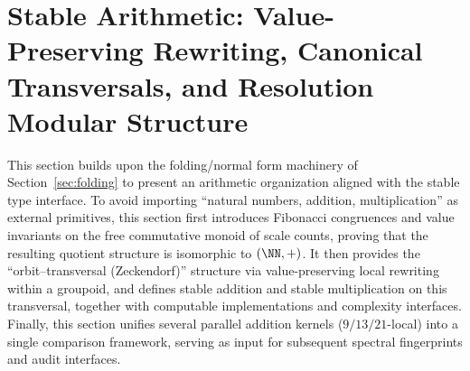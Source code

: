 \section{Stable Arithmetic: Value-Preserving Rewriting, Canonical Transversals, and Resolution Modular Structure}\label{sec:emergent-arithmetic}

This section builds upon the folding/normal form machinery of Section~\ref{sec:folding} to present an arithmetic organization aligned with the stable type interface. To avoid importing ``natural numbers, addition, multiplication'' as external primitives, this section first introduces Fibonacci congruences and value invariants on the free commutative monoid of scale counts, proving that the resulting quotient structure is isomorphic to \((\NN,+)\). It then provides the ``orbit--transversal (Zeckendorf)'' structure via value-preserving local rewriting within a groupoid, and defines stable addition and stable multiplication on this transversal, together with computable implementations and complexity interfaces. Finally, this section unifies several parallel addition kernels (\(9/13/21\)-local) into a single comparison framework, serving as input for subsequent spectral fingerprints and audit interfaces.














